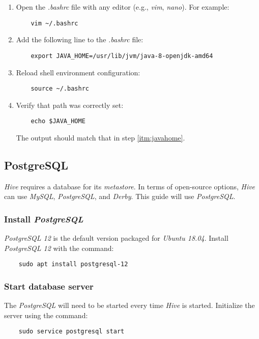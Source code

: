 \documentclass{article}
\begin{document}
    \begin{enumerate}
    \item Open the \emph{.bashrc} file with any editor (e.g., \emph{vim}, \emph{nano}).
    For example:
    \begin{verbatim}
    vim ~/.bashrc
    \end{verbatim}
    
    \item Add the following line to the \emph{.bashrc} file:
    \label{itm:javahome}
    \begin{verbatim}
    export JAVA_HOME=/usr/lib/jvm/java-8-openjdk-amd64                 
    \end{verbatim}
    
    \item Reload shell environment configuration:
    \begin{verbatim}
    source ~/.bashrc
    \end{verbatim}
    
    \item Verify that path was correctly set:
    \begin{verbatim}
    echo $JAVA_HOME
    \end{verbatim}
    The output should match that in step \ref{itm:javahome}.
    \end{enumerate}

  \subsection{PostgreSQL}
  \label{subsec:postgres}
  \emph{Hive} requires a database for its \emph{metastore}. In terms of open-source options,
  \emph{Hive} can use \emph{MySQL}, \emph{PostgreSQL}, and \emph{Derby}. This guide will use
  \emph{PostgreSQL}.

    \subsubsection{Install \emph{PostgreSQL}}
    \emph{PostgreSQL 12} is the default version packaged for \emph{Ubuntu 18.04}. Install
    \emph{PostgreSQL 12} with the command:
    \begin{verbatim}
    sudo apt install postgresql-12
    \end{verbatim}

    \subsubsection{Start database server}
    \label{subsec:pgsstart}
    The \emph{PostgreSQL} will need to be started every time \emph{Hive} is started. Initialize the
    server using the command:
    \begin{verbatim}
    sudo service postgresql start
    \end{verbatim}
\end{document}
